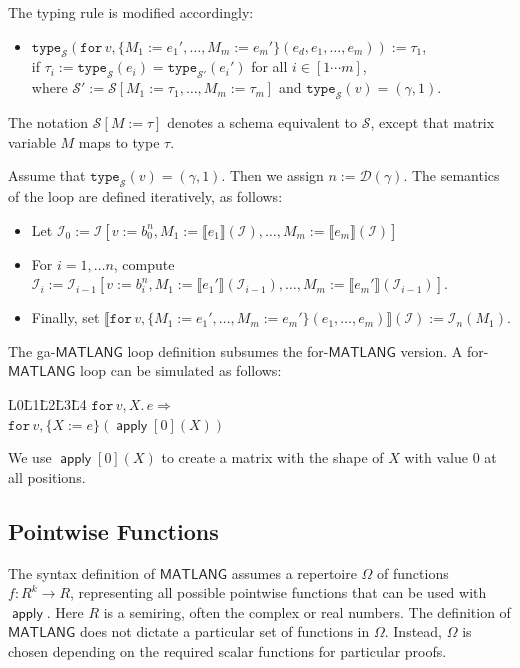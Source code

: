 \documentclass{article}
\newcommand{\ML}{\mathsf{MATLANG}}
\DeclareMathOperator{\Apply}{\mathsf{apply}}
\newcommand{\ffor}[3]{\texttt{for}\, #1,#2 \texttt{.}\, #3}
\newcommand{\I}{\mathcal{I}}
\newcommand{\Sch}{\mathcal{S}}
\newcommand{\ttype}{\texttt{type}}
\newcommand{\ttypes}{\texttt{type}_{\Sch}}
\newcommand{\dom}{\mathcal{D}}
\newcommand{\sem}[2]{\llbracket #1 \rrbracket(#2)}
\begin{document}
The typing rule is modified accordingly:

\begin{itemize}
    \item $\ttypes(\texttt{for}\, v,\{ M_1 := e_1', \ldots, M_m := e_m' \}(e_d, e_1, \ldots, e_m)) := \tau_1$,\\
          if $\tau_i := \ttypes(e_i) = \ttype_{\Sch'}(e_i')$ for all $i \in [1 \cdots m]$,\\
          where $\Sch' := \Sch[M_1 := \tau_1,\ldots,M_m := \tau_m]$
          and $\ttypes(v) = (\gamma,1)$.
\end{itemize}

The notation $\Sch[M := \tau]$ denotes a schema equivalent to $\Sch$, except that matrix variable $M$ maps to type $\tau$.

Assume that $\ttypes(v) = (\gamma,1)$.
Then we assign $n := \dom(\gamma)$.
The semantics of the loop are defined iteratively, as follows:
\begin{itemize}
    \item Let $\I_0 := \I[v := b^{n}_0, M_1 := \sem{e_1}{\I}, \ldots, M_m := \sem{e_m}{\I}]$
    \item For $i = 1,\ldots n$, compute $\I_i := \I_{i-1}[v := b^{n}_i, M_1 := \sem{e_1'}{\I_{i-1}}, \ldots, M_m := \sem{e_m'}{\I_{i-1}}]$.
    \item Finally, set $\sem{\texttt{for}\, v,\{ M_1 := e_1', \ldots, M_m := e_m' \}(e_1, \ldots, e_m)}{\I}:= \I_n(M_1)$.
\end{itemize}

The ga-$\ML$ loop definition subsumes the for-$\ML$ version. A for-$\ML$ loop can be simulated as follows:

\begin{tabbing}
    L0\=L1\=L2\=L3\=L4 \kill
    $\ffor{v}{X}{e} \Rightarrow$\\
    $\texttt{for}\, v,\{ X := e \}(\Apply[0](X))$\\
\end{tabbing}

We use $\Apply[0](X)$ to create a matrix with the shape of $X$ with value $0$ at all positions.

\subsection{Pointwise Functions}\label{sec:pointwise}
The syntax definition of $\ML$ assumes a repertoire $\Omega$ of functions $f : R^k \to R$, representing all possible pointwise functions that can be used with $\Apply$.
Here $R$ is a semiring, often the complex or real numbers.
The definition of $\ML$ does not dictate a particular set of functions in $\Omega$.
Instead, $\Omega$ is chosen depending on the required scalar functions for particular proofs.
\end{document}
